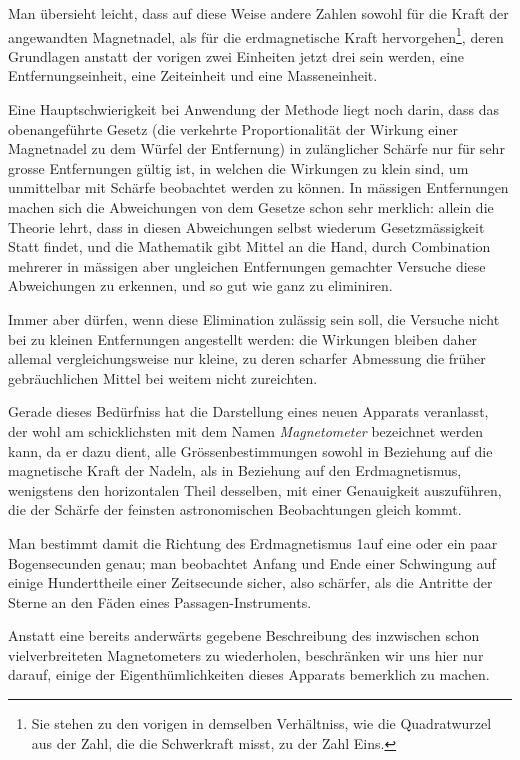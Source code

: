 \documentclass[12pt,a4paper]{article}
\begin{document}
Man übersieht leicht, dass auf diese Weise andere Zahlen sowohl für die Kraft der angewandten Magnetnadel, als für die erdmagnetische Kraft hervorgehen\footnote{Sie stehen zu den vorigen in demselben Verhältniss, wie die Quadratwurzel aus der Zahl, die die Schwerkraft misst, zu der Zahl Eins.}, deren Grundlagen anstatt der vorigen zwei Einheiten jetzt drei sein werden, eine Entfernungseinheit, eine Zeiteinheit und eine Masseneinheit.

\bigskip

Eine Hauptschwierigkeit bei Anwendung der Methode liegt noch darin, dass das obenangeführte Gesetz (die verkehrte Proportionalität der Wirkung einer Magnetnadel zu dem Würfel der Entfernung) in zulänglicher Schärfe nur für sehr grosse Entfernungen gültig ist, in welchen die Wirkungen zu klein sind, um unmittelbar mit Schärfe beobachtet werden zu können. In mässigen Entfernungen machen sich die Abweichungen von dem Gesetze schon sehr merklich: allein die Theorie lehrt, dass in diesen Abweichungen selbst wiederum Gesetzmässigkeit Statt findet, und die Mathematik gibt Mittel an die Hand, durch Combination mehrerer in mässigen aber ungleichen Entfernungen gemachter Versuche diese Abweichungen zu erkennen, und so gut wie ganz zu eliminiren.

Immer aber dürfen, wenn diese Elimination zulässig sein soll, die Versuche nicht bei zu kleinen Entfernungen angestellt werden: die Wirkungen bleiben daher allemal vergleichungsweise nur kleine, zu deren scharfer Abmessung die früher gebräuchlichen Mittel bei weitem nicht zureichten.

Gerade dieses Bedürfniss hat die Darstellung eines neuen Apparats veranlasst, der wohl am schicklichsten mit dem Namen \textit{Magnetometer} bezeichnet werden kann, da er dazu dient, alle Grössenbestimmungen sowohl in Beziehung auf die magnetische Kraft der Nadeln, als in Beziehung auf den Erdmagnetismus, wenigstens den horizontalen Theil desselben, mit einer Genauigkeit auszuführen, die der Schärfe der feinsten astronomischen Beobachtungen gleich kommt.

Man bestimmt damit die Richtung des Erdmagnetismus 1auf eine oder ein paar Bogensecunden genau; man beobachtet Anfang und Ende einer Schwingung auf einige Hunderttheile einer Zeitsecunde sicher, also schärfer, als die Antritte der Sterne an den Fäden eines Passagen-Instruments.

Anstatt eine bereits anderwärts gegebene Beschreibung des inzwischen schon vielverbreiteten Magnetometers zu wiederholen, beschränken wir uns hier nur darauf, einige der Eigenthümlichkeiten dieses Apparats bemerklich zu machen.
\end{document}
